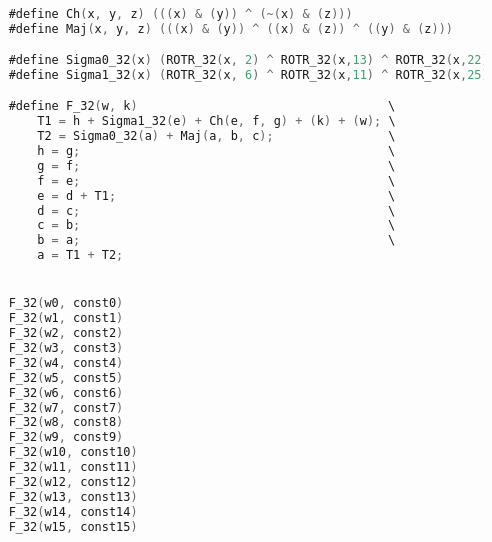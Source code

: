 \begin{lstlisting}[language=C,caption={Group of 16 \texttt{F\_32(w,k)} macros.},
label={lst:F32_macro}]

    #define Ch(x, y, z) (((x) & (y)) ^ (~(x) & (z)))
    #define Maj(x, y, z) (((x) & (y)) ^ ((x) & (z)) ^ ((y) & (z)))

    #define Sigma0_32(x) (ROTR_32(x, 2) ^ ROTR_32(x,13) ^ ROTR_32(x,22))
    #define Sigma1_32(x) (ROTR_32(x, 6) ^ ROTR_32(x,11) ^ ROTR_32(x,25))

    #define F_32(w, k)                                   \
        T1 = h + Sigma1_32(e) + Ch(e, f, g) + (k) + (w); \
        T2 = Sigma0_32(a) + Maj(a, b, c);                \
        h = g;                                           \
        g = f;                                           \
        f = e;                                           \
        e = d + T1;                                      \
        d = c;                                           \
        c = b;                                           \
        b = a;                                           \
        a = T1 + T2;


    F_32(w0, const0)
    F_32(w1, const1)
    F_32(w2, const2)
    F_32(w3, const3)
    F_32(w4, const4)
    F_32(w5, const5)
    F_32(w6, const6)
    F_32(w7, const7)
    F_32(w8, const8)
    F_32(w9, const9)
    F_32(w10, const10)
    F_32(w11, const11)
    F_32(w12, const12)
    F_32(w13, const13)
    F_32(w14, const14)
    F_32(w15, const15)

\end{lstlisting}

